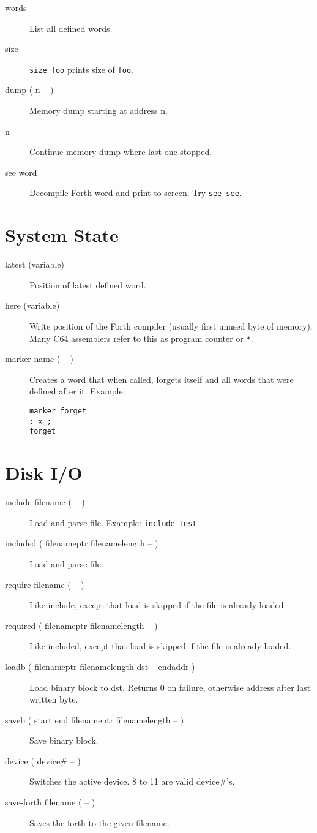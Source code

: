 \begin{description}
\item[words] List all defined words.
\item[size] \texttt{size foo} prints size of \texttt{foo}.
\item[dump ( n -- )] Memory dump starting at address n.
\item[n] Continue memory dump where last one stopped.
\item[see word] Decompile Forth word and print to screen. Try \texttt{see see}.
\end{description}

\section{System State}

\begin{description}

\item[latest (variable)] Position of latest defined word.

\item[here (variable)] Write position of the Forth compiler (usually first unused byte of memory). Many C64 assemblers refer to this as program counter or \texttt{*}.

\item[marker name ( -- )] Creates a word that when called, forgets itself and all words that were defined after it. Example:

\begin{verbatim}
marker forget
: x ;
forget
\end{verbatim}
\end{description}

\section{Disk I/O}

\begin{description}
\item[include filename ( -- )] Load and parse file. Example: \texttt{include test}
\item[included ( filenameptr filenamelength -- )] Load and parse file.
\item[require filename ( -- )] Like include, except that load is skipped if the file is already loaded.
\item[required ( filenameptr filenamelength -- )] Like included, except that load is skipped if the file is already loaded.
\item[loadb ( filenameptr filenamelength dst -- endaddr )] Load binary block to dst. Returns 0 on failure, otherwise address after last written byte.
\item[saveb ( start end filenameptr filenamelength -- )] Save binary block.
\item[device ( device\# -- )] Switches the active device. 8 to 11 are valid device\#'s.
\item[save-forth filename ( -- )] Saves the forth to the given filename.
\end{description}

